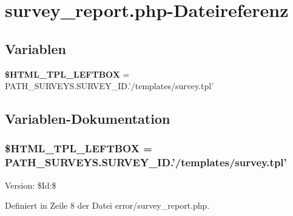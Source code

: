 \section{survey\_\-report.php-Dateireferenz}
\label{error_2survey__report_8php}
\subsection*{Variablen}
\begin{CompactItemize}
\item 
{\bf \$HTML\_\-TPL\_\-LEFTBOX} = PATH\_\-SURVEYS.SURVEY\_\-ID.'/templates/survey.tpl'
\end{CompactItemize}


\subsection{Variablen-Dokumentation}
\subsubsection{\setlength{\rightskip}{0pt plus 5cm}\$HTML\_\-TPL\_\-LEFTBOX = PATH\_\-SURVEYS.SURVEY\_\-ID.'/templates/survey.tpl'}\label{error_2survey__report_8php_19d93cdfaed5a4e939eae3d2d5c455af}


\begin{Desc}
\item[Version:]\$Id:\$ \end{Desc}


Definiert in Zeile 8 der Datei error/survey\_\-report.php.